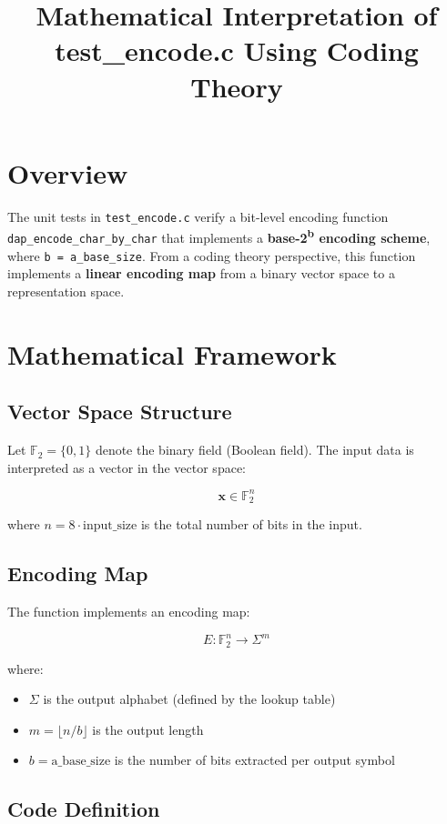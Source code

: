 \documentclass[11pt,a4paper]{article}
\title{Mathematical Interpretation of test\_encode.c Using Coding Theory}
\author{}
\date{}
\begin{document}
\maketitle

\section{Overview}

The unit tests in \texttt{test\_encode.c} verify a bit-level encoding function \texttt{dap\_encode\_char\_by\_char} that implements a \textbf{base-2\textsuperscript{b} encoding scheme}, where \texttt{b = a\_base\_size}. From a coding theory perspective, this function implements a \textbf{linear encoding map} from a binary vector space to a representation space.

\section{Mathematical Framework}

\subsection{Vector Space Structure}

Let $\mathbb{F}_2 = \{0, 1\}$ denote the binary field (Boolean field). The input data is interpreted as a vector in the vector space:

$$\mathbf{x} \in \mathbb{F}_2^n$$

where $n = 8 \cdot \text{input\_size}$ is the total number of bits in the input.

\subsection{Encoding Map}

The function implements an encoding map:

$$E: \mathbb{F}_2^n \rightarrow \Sigma^m$$

where:
\begin{itemize}
\item $\Sigma$ is the output alphabet (defined by the lookup table)
\item $m = \lfloor n/b \rfloor$ is the output length
\item $b = \text{a\_base\_size}$ is the number of bits extracted per output symbol
\end{itemize}

\subsection{Code Definition}
\end{document}
